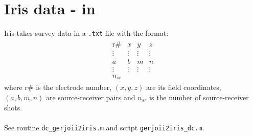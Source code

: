 \documentclass[a4paper,12pt]{article}
\begin{document}
\section{Iris data - in}
Iris takes survey data in a \texttt{.txt} file with the format:
\begin{align}
\begin{matrix}
\text{r\#} & x & y & z \\
\vdots & \vdots & \vdots & \vdots \\
a & b & m & n \\
\vdots & \vdots & \vdots & \vdots \\
n_{sr}
\end{matrix}
\end{align}
where r\# is the electrode number, $(x,y,z)$ are its field coordinates, $(a,b,m,n)$ are source-receiver pairs and $n_{sr}$ is the number of source-receiver shots.
\\\\
See routine \texttt{dc\_gerjoii2iris.m} and script \texttt{gerjoii2iris\_dc.m}.
\\\\
\end{document}
